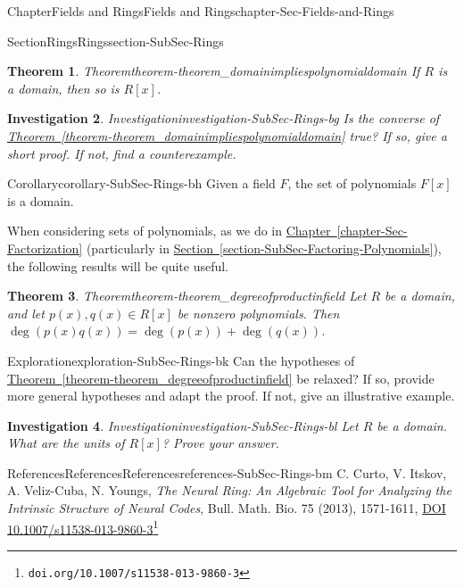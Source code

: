 \documentclass[oneside,10pt,]{book}
\newcommand{\xreffont}{\relax}
\numberwithin{equation}{section}
\newtheorem{theorem}{Theorem}[section]
\newtheorem{investigation}[theorem]{Investigation}
\begin{document}
\begin{chapterptx}{Chapter}{Fields and Rings}{}{Fields and Rings}{}{}{chapter-Sec-Fields-and-Rings}
\begin{sectionptx}{Section}{Rings}{}{Rings}{}{}{section-SubSec-Rings}
\begin{theorem}{Theorem}{}{}{theorem-theorem_domainimpliespolynomialdomain}
If \(R\) is a domain, then so is \(R[x]\).%
\end{theorem}
\begin{investigation}{Investigation}{}{investigation-SubSec-Rings-bg}%
Is the converse of \hyperref[theorem-theorem_domainimpliespolynomialdomain]{Theorem~{\xreffont\ref{theorem-theorem_domainimpliespolynomialdomain}}} true? If so, give a short proof. If not, find a counterexample.%
\end{investigation}%
\begin{corollary}{Corollary}{}{}{corollary-SubSec-Rings-bh}%
Given a field \(F\), the set of polynomials \(F[x]\) is a domain.%
\end{corollary}
When considering sets of polynomials, as we do in \hyperref[chapter-Sec-Factorization]{Chapter~{\xreffont\ref{chapter-Sec-Factorization}}} (particularly in \hyperref[section-SubSec-Factoring-Polynomials]{Section~{\xreffont\ref{section-SubSec-Factoring-Polynomials}}}), the following results will be quite useful.%
\begin{theorem}{Theorem}{}{}{theorem-theorem_degreeofproductinfield}%
Let \(R\) be a domain, and let \(p(x),q(x)\in R[x]\) be nonzero polynomials. Then \(\deg(p(x) q(x)) = \deg(p(x)) + \deg(q(x))\).%
\end{theorem}
\begin{exploration}{Exploration}{}{exploration-SubSec-Rings-bk}%
Can the hypotheses of \hyperref[theorem-theorem_degreeofproductinfield]{Theorem~{\xreffont\ref{theorem-theorem_degreeofproductinfield}}} be relaxed? If so, provide more general hypotheses and adapt the proof. If not, give an illustrative example.%
\end{exploration}%
\begin{investigation}{Investigation}{}{investigation-SubSec-Rings-bl}%
Let \(R\) be a domain. What are the units of \(R[x]\)? Prove your answer.%
\end{investigation}%
%
%
\typeout{************************************************}
\typeout{************************************************}
%
\begin{references-subsection-numberless}{References}{References}{}{References}{}{}{references-SubSec-Rings-bm}
C. Curto, V. Itskov, A. Veliz-Cuba, N. Youngs, \emph{The Neural Ring: An Algebraic Tool for Analyzing the Intrinsic Structure of Neural Codes}, Bull. Math. Bio. 75 (2013), 1571-1611, \href{https://doi.org/10.1007/s11538-013-9860-3}{DOI 10.1007\slash{}s11538-013-9860-3}\footnote{\nolinkurl{doi.org/10.1007/s11538-013-9860-3}\label{fn-Curto2013-c}}\end{references-subsection-numberless}

\end{sectionptx}
\end{chapterptx}
\end{document}
